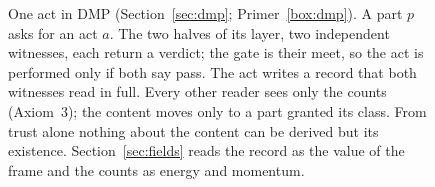 \begin{figure}[tbp]
\caption{One act in DMP (Section~\ref{sec:dmp}; Primer~\ref{box:dmp}). A part $p$ asks for an act $a$. The two halves of its layer, two
independent witnesses, each return a verdict; the gate is their meet, so the act is performed only if both say \textsf{pass}. The act
writes a record that both witnesses read in full. Every other reader sees only the counts (Axiom~3); the content moves only to a part
granted its class. From trust alone nothing about the content can be derived but its existence. Section~\ref{sec:fields} reads the record
as the value of the frame and the counts as energy and momentum.}
\label{fig:act}
\end{figure}
